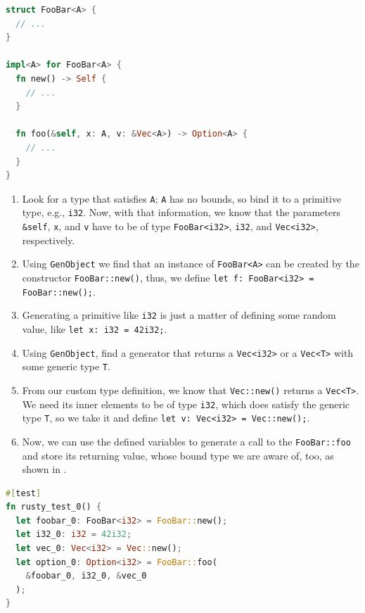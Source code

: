 \documentclass[paper=a4,%
  twoside,%
  BCOR4mm,%
  abstract=true,%
  toc=bibliography,%
  chapterprefix=true,%
  toc=bibliographynumbered,%
  open=right,%
  english,%
  pagesize=pdftex]{scrreprt}
\begin{document}
\begin{lstlisting}[language=Rust, style=boxed, caption={A generic type A is used in multiple parameters and return value}, label=lst:generic-type-used-in-multiple-params]
struct FooBar<A> { 
  // ...
}

impl<A> for FooBar<A> {
  fn new() -> Self {
    // ...
  }

  fn foo(&self, x: A, v: &Vec<A>) -> Option<A> {
    // ...
  }
}
\end{lstlisting}

\begin{enumerate}
    \item Look for a type that satisfies \lstinline{A}; \lstinline{A} has no bounds, so bind it to a primitive type, e.g., \lstinline{i32}. Now, with that information, we know that the parameters \lstinline{&self}, \lstinline{x}, and \lstinline{v} have to be of type \lstinline{FooBar<i32>}, \lstinline{i32}, and \lstinline{Vec<i32>}, respectively.
    \item Using \lstinline{GenObject} we find that an instance of \lstinline{FooBar<A>} can be created by the constructor \lstinline{FooBar::new()}, thus, we define \lstinline{let f: FooBar<i32> = FooBar::new();}.
    \item Generating a primitive like \lstinline{i32} is just a matter of defining some random value, like \lstinline{let x: i32 = 42i32;}.
    \item Using \lstinline{GenObject}, find a generator that returns a \lstinline{Vec<i32>} or a \lstinline{Vec<T>} with some generic type \lstinline{T}.
    \item From our custom type definition, we know that \lstinline{Vec::new()} returns a \lstinline{Vec<T>}. We need its inner elements to be of type \lstinline{i32}, which does satisfy the generic type \lstinline{T}, so we take it and define \lstinline{let v: Vec<i32> = Vec::new();}.
    \item Now, we can use the defined variables to generate a call to the \lstinline{FooBar::foo} and store its returning value, whose bound type we are aware of, too, as shown in .
\end{enumerate}

\begin{lstlisting}[language=Rust, style=boxed, caption={An example test that invokes \lstinline{FooBar::foo}}, label=lst:example-generated-test]
#[test]
fn rusty_test_0() {
  let foobar_0: FooBar<i32> = FooBar::new();
  let i32_0: i32 = 42i32;
  let vec_0: Vec<i32> = Vec::new();
  let option_0: Option<i32> = FooBar::foo(
    &foobar_0, i32_0, &vec_0
  );
}
\end{lstlisting}
\end{document}
